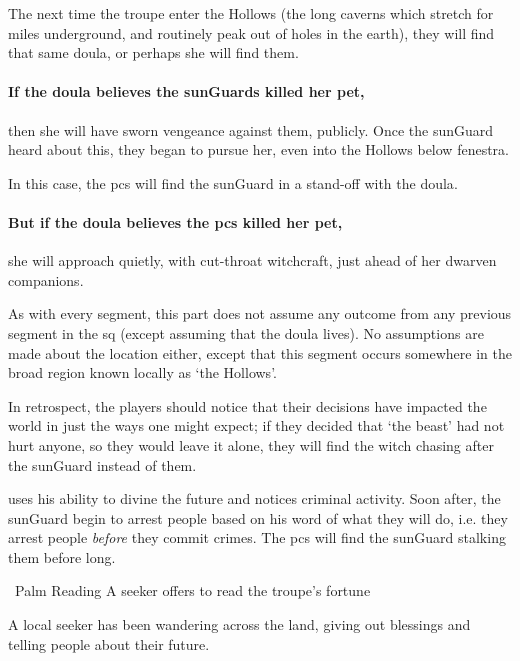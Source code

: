 \begin{multicols}{2}
The next time the troupe enter the Hollows (the long caverns which stretch for miles underground, and routinely peak out of holes in the earth), they will find that same \gls{doula}, or perhaps she will find them.

\paragraph{If the \gls{doula} believes the \glspl{sunGuard} killed her pet,}
then she will have sworn vengeance against them, publicly.
Once the \gls{sunGuard} heard about this, they began to pursue her, even into the Hollows below \gls{fenestra}.

In this case, the \glspl{pc} will find the \gls{sunGuard} in a stand-off with the \gls{doula}.

\paragraph{But if the \gls{doula} believes the \glspl{pc} killed her pet,}
she will approach quietly, with cut-throat witchcraft, just ahead of her dwarven companions.

As with every \gls{segment}, this part does not assume any outcome from any previous \gls{segment} in the \gls{sq} (except assuming that the \gls{doula} lives).
No assumptions are made about the location either, except that this segment occurs somewhere in the broad region known locally as `the Hollows'.

In retrospect, the players should notice that their decisions have impacted the world in just the ways one might expect; if they decided that `the beast' had not hurt anyone, so they would leave it alone, they will find the witch chasing after the \gls{sunGuard} instead of them.


 uses his ability to divine the future and notices criminal activity.
Soon after, the \gls{sunGuard} begin to arrest people based on his word of what they will do, i.e. they arrest people \emph{before} they commit crimes.
The \glspl{pc} will find the \gls{sunGuard} stalking them before long.

{\squash~Palm Reading}%
{A \gls{seeker} offers to read the troupe's fortune}%

\begin{exampletext}
  A local \gls{seeker} has been wandering across the land, giving out blessings and telling people about their future.
\end{exampletext}


\end{multicols}
